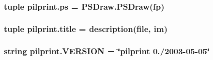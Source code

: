 \hypertarget{namespacepilprint_aba88a64e0d2143af5a1255b3bc8dfb15}{
\subsubsection[{ps}]{\setlength{\rightskip}{0pt plus 5cm}tuple pilprint.\-ps = P\-S\-Draw.\-P\-S\-Draw({\bf fp})}}\label{namespacepilprint_aba88a64e0d2143af5a1255b3bc8dfb15}
\hypertarget{namespacepilprint_a0444e219e533104638749b8c91f07160}{
\subsubsection[{title}]{\setlength{\rightskip}{0pt plus 5cm}tuple pilprint.\-title = {\bf description}(file, {\bf im})}}\label{namespacepilprint_a0444e219e533104638749b8c91f07160}
\hypertarget{namespacepilprint_abc1204fef3f00504f698236ea8c8ffa3}{
\subsubsection[{V\-E\-R\-S\-I\-O\-N}]{\setlength{\rightskip}{0pt plus 5cm}string pilprint.\-V\-E\-R\-S\-I\-O\-N = \char`\"{}pilprint 0./2003-\/05-\/05\char`\"{}}}\label{namespacepilprint_abc1204fef3f00504f698236ea8c8ffa3}
